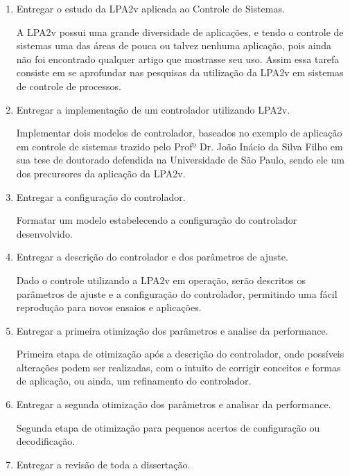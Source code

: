 \begin{enumerate}
  \item \label{LPA2v}	    Entregar o estudo da LPA2v aplicada ao Controle de Sistemas.

A LPA2v possui uma grande diversidade de aplicações, 
e tendo o controle de sistemas 
uma das áreas de pouca ou talvez nenhuma aplicação, 
pois ainda não foi encontrado qualquer artigo que mostrasse seu uso. 
Assim essa tarefa consiste em se aprofundar nas pesquisas 
da utilização da LPA2v em sistemas de controle de processos. 

  \item \label{controlar}   Entregar a implementação de um controlador utilizando LPA2v.

Implementar dois modelos de controlador, 
baseados no exemplo de aplicação em controle de sistemas
trazido pelo Profº Dr. João Inácio da Silva Filho em sua 
tese de doutorado defendida na Universidade de São Paulo, 
sendo ele um dos precursores da aplicação da LPA2v. 

  \item \label{configurar}  Entregar a configuração do controlador.

Formatar um modelo estabelecendo a configuração do controlador desenvolvido.

  \item \label{descrever}   Entregar a descrição do controlador e dos parâmetros de ajuste.

Dado o controle utilizando a LPA2v em operação, 
serão descritos os parâmetros de ajuste e a configuração do controlador, 
permitindo uma fácil reprodução para novos ensaios e aplicações.

  \item \label{otimizar1}   Entregar a primeira otimização dos parâmetros e analise da performance.

Primeira etapa de otimização após a descrição do controlador,
onde possíveis alterações podem ser realizadas, 
com o intuito de corrigir conceitos e 
formas de aplicação, ou ainda, 
um refinamento do controlador.

  \item \label{otimizar2}   Entregar a segunda otimização dos parâmetros e analisar da performance.

Segunda etapa de otimização para pequenos acertos de 
configuração ou decodificação.

  \item \label{entregar}    Entregar a revisão de toda a dissertação.


\end{enumerate}
